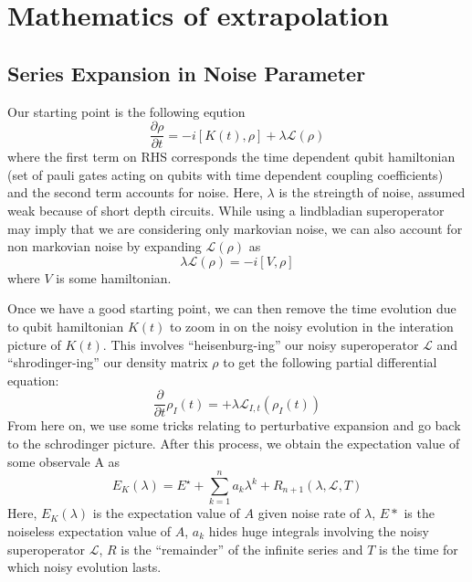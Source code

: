 \documentclass{article}
\begin{document}
\section{Mathematics of extrapolation}
\subsection{Series Expansion in Noise Parameter}
Our starting point is the following eqution
\begin{equation}
  \frac{\partial \rho}{\partial t} = -i[K(t), \rho] + \lambda\mathcal{L}(\rho)
\end{equation}
where the first term on RHS corresponds the time dependent qubit hamiltonian (set
of pauli gates acting on qubits with time dependent coupling coefficients) and the
second term accounts for noise. Here, \(\lambda\) is the streingth of noise, assumed
weak because of short depth circuits. While using a lindbladian superoperator may
imply that we are considering only markovian noise, we can also account for
non markovian noise by expanding \(\mathcal{L}(\rho)\) as
\begin{equation}
  \lambda\mathcal{L}(\rho) = -i[V, \rho]
\end{equation}
where \(V\) is some hamiltonian.

Once we have a good starting point, we can then remove the time evolution due
to qubit hamiltonian \(K(t)\) to zoom in on the noisy evolution in the
interation picture of \(K(t)\). This involves ``heisenburg-ing'' our noisy
superoperator \(\mathcal{L}\) and ``shrodinger-ing'' our density matrix
\(\rho\) to get the following partial differential equation:
\begin{equation}
  \frac{\partial}{\partial t}\rho_I(t) = + \lambda\mathcal{L}_{I, t}(\rho_I(t))
\end{equation}
From here on, we use some tricks relating to perturbative expansion and go back
to the schrodinger picture. After this process, we obtain the expectation value
of some observale A as
\begin{equation} \label{eq:10}
  E_K(\lambda) = E^\star + \sum_{k=1}^n a_k\lambda^k + R_{n+1}(\lambda, \mathcal{L}, T)
\end{equation}
Here, \(E_K(\lambda)\) is the expectation value of \(A\) given noise rate of
\(\lambda\), \(E*\) is the noiseless expectation value of \(A\), \(a_k\) hides huge integrals
involving the noisy superoperator \(\mathcal{L}\), \(R\) is the ``remainder''
of the infinite series and \(T\) is the time for which noisy evolution lasts.
\end{document}
